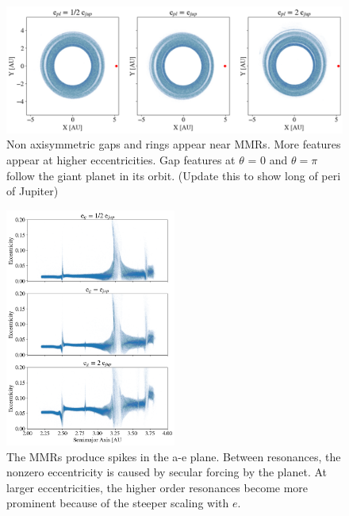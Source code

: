 \documentclass[onecolumn]{aastex63}
\begin{document}
\begin{figure}
\begin{center}
    \includegraphics[width=\textwidth]{figures/xy.png}
    \caption{Non axisymmetric gaps and rings appear near MMRs. More features appear at higher eccentricities. Gap features
    at $\theta$ = 0 and $\theta = \pi$ follow the giant planet in its orbit. (Update this to show long of peri of Jupiter)\label{fig:xy}}
\end{center}
\end{figure}

\begin{figure}
\begin{center}
    \includegraphics[width=0.5\textwidth]{figures/ae.png}
    \caption{The MMRs produce spikes in the a-e plane. Between resonances, the nonzero eccentricity is caused by secular
    forcing by the planet. At larger eccentricities, the higher order resonances become more prominent because of the steeper
    scaling with $e$.\label{fig:ae}}
\end{center}
\end{figure}
\end{document}
